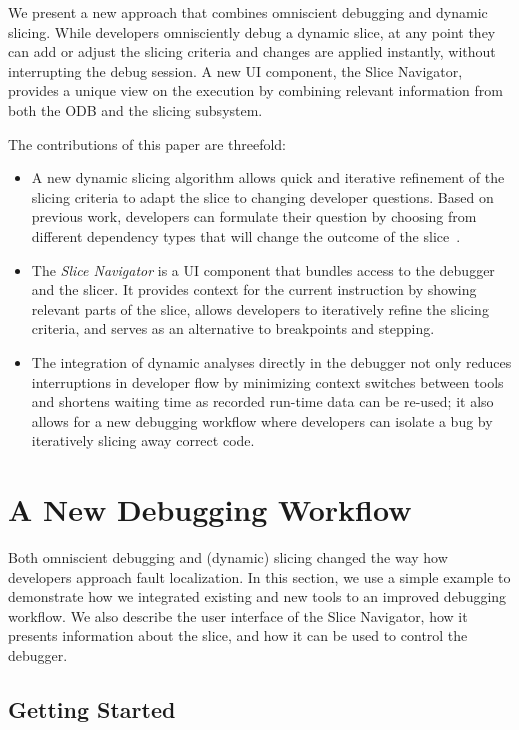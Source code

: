 We present a new approach that combines omniscient debugging and dynamic slicing.
While developers omnisciently debug a dynamic slice, at any point they can add or adjust the slicing criteria and changes are applied instantly, without interrupting the debug session.
A new UI component, the Slice Navigator, provides a unique view on the execution by combining relevant information from both the ODB and the slicing subsystem.

The contributions of this paper are threefold:
\begin{itemize}
	\item A new dynamic slicing algorithm allows quick and iterative refinement of the slicing criteria to adapt the slice to changing developer questions.
		Based on previous work, developers can formulate their question by choosing from different dependency types that will change the outcome of the slice~\cite{treffer_dynamic_2014}.
	\item The \emph{Slice Navigator} is a UI component that bundles access to the debugger and the slicer.
		It provides context for the current instruction by showing relevant parts of the slice, allows developers to iteratively refine the slicing criteria, and serves as an alternative to breakpoints and stepping.
	\item The integration of dynamic analyses directly in the debugger not only reduces interruptions in developer flow by minimizing context switches between tools and shortens waiting time as recorded run-time data can be re-used; it also allows for a new debugging workflow where developers can isolate a bug by iteratively slicing away correct code.
\end{itemize}

\section{A New Debugging Workflow}
\label{sec:workflow}

Both omniscient debugging and (dynamic) slicing changed the way how developers approach fault localization.
In this section, we use a simple example to demonstrate how we integrated existing and new tools to an improved debugging workflow.
We also describe the user interface of the Slice Navigator, how it presents information about the slice, and how it can be used to control the debugger.

\subsection{Getting Started}
\label{lst:example}

